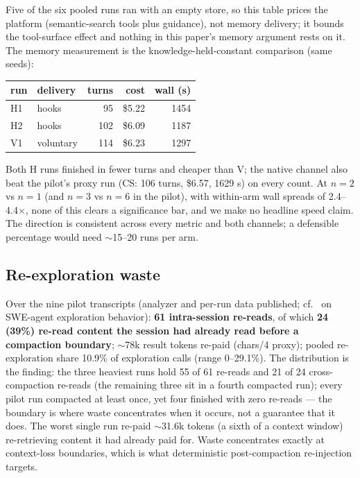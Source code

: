 \documentclass[11pt]{article}
\begin{document}
Five of the six pooled runs ran with an empty store, so this table
prices the platform (semantic-search tools plus guidance), not memory
delivery; it bounds the tool-surface effect and nothing in this paper's
memory argument rests on it. The memory measurement is the
knowledge-held-constant comparison (same seeds):

\begin{table}[h]
\centering
\small
\begin{tabular}{@{}llrrr@{}}
\toprule
\textbf{run} & \textbf{delivery} & \textbf{turns} & \textbf{cost} & \textbf{wall (s)} \\
\midrule
H1 & hooks & 95 & \$5.22 & 1454 \\
H2 & hooks & 102 & \$6.09 & 1187 \\
V1 & voluntary & 114 & \$6.23 & 1297 \\
\bottomrule
\end{tabular}
\end{table}

Both H runs finished in fewer turns and cheaper than V; the native
channel also beat the pilot's proxy run (CS: 106 turns, \$6.57, 1629 s)
on every count. At $n=2$ vs $n=1$ (and $n=3$ vs $n=6$ in the pilot), with
within-arm wall spreads of 2.4--4.4$\times$, none of this clears a significance
bar, and we make no headline speed claim. The direction is consistent
across every metric and both channels; a defensible percentage would
need $\sim$15--20 runs per arm.

\subsection{Re-exploration waste}
\label{sec:waste}

Over the nine pilot transcripts (analyzer and per-run data published;
cf.~\cite{sweexplore} on SWE-agent exploration behavior): \textbf{61 intra-session
re-reads}, of which \textbf{24 (39\%) re-read content the session had
already read before a compaction boundary}; $\sim$78k result tokens
re-paid (chars/4 proxy); pooled re-exploration share 10.9\% of
exploration calls (range 0--29.1\%). The distribution is the finding:
the three heaviest runs hold 55 of 61 re-reads and 21 of 24
cross-compaction re-reads (the remaining three sit in a fourth
compacted run); every pilot run compacted at least once, yet four
finished with zero re-reads --- the boundary is where waste concentrates
when it occurs, not a guarantee that it does. The worst single run re-paid $\sim$31.6k
tokens (a sixth of a context window) re-retrieving content it had
already paid for. Waste concentrates exactly at context-loss
boundaries, which is what deterministic post-compaction re-injection
targets.
\end{document}

